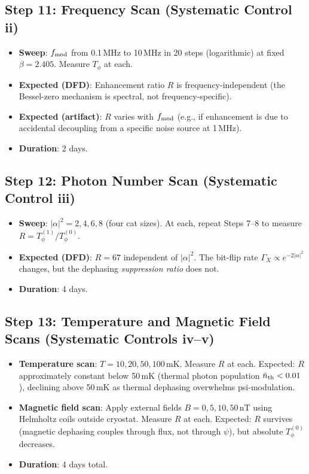 \documentclass[11pt]{article}
\theoremstyle{definition}
\theoremstyle{remark}
\begin{document}
\subsection{Step 11: Frequency Scan (Systematic Control ii)}

\begin{itemize}[nosep]
\item \textbf{Sweep}: $f_{\rm mod}$ from 0.1\,MHz to 10\,MHz in 20 steps
  (logarithmic) at fixed $\beta = 2.405$. Measure $T_\phi$ at each.
\item \textbf{Expected (DFD)}: Enhancement ratio $R$ is frequency-independent
  (the Bessel-zero mechanism is spectral, not frequency-specific).
\item \textbf{Expected (artifact)}: $R$ varies with $f_{\rm mod}$
  (e.g., if enhancement is due to accidental decoupling from a specific
  noise source at 1\,MHz).
\item \textbf{Duration}: 2 days.
\end{itemize}

\subsection{Step 12: Photon Number Scan (Systematic Control iii)}

\begin{itemize}[nosep]
\item \textbf{Sweep}: $|\alpha|^2 = 2, 4, 6, 8$ (four cat sizes).
  At each, repeat Steps 7--8 to measure $R = T_\phi^{(1)}/T_\phi^{(0)}$.
\item \textbf{Expected (DFD)}: $R = 67$ independent of $|\alpha|^2$.
  The bit-flip rate $\Gamma_X \propto e^{-2|\alpha|^2}$ changes, but
  the dephasing \emph{suppression ratio} does not.
\item \textbf{Duration}: 4 days.
\end{itemize}

\subsection{Step 13: Temperature and Magnetic Field Scans
  (Systematic Controls iv--v)}

\begin{itemize}[nosep]
\item \textbf{Temperature scan}: $T = 10, 20, 50, 100$\,mK. Measure
  $R$ at each. Expected: $R$ approximately constant below 50\,mK
  (thermal photon population $\bar{n}_{\rm th} < 0.01$), declining
  above 50\,mK as thermal dephasing overwhelms psi-modulation.
\item \textbf{Magnetic field scan}: Apply external fields $B = 0, 5, 10, 50$\,nT
  using Helmholtz coils outside cryostat. Measure $R$ at each.
  Expected: $R$ survives (magnetic dephasing couples through flux,
  not through $\psi$), but absolute $T_\phi^{(0)}$ decreases.
\item \textbf{Duration}: 4 days total.
\end{itemize}
\end{document}
